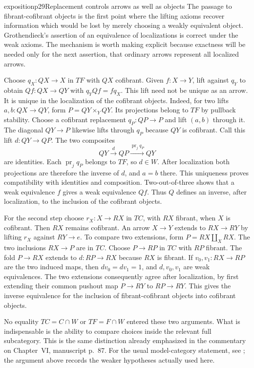 \begin{dcomment}{exposition}{p29}{Replacement controls arrows as well as objects}
The passage to fibrant-cofibrant objects is the first point where the lifting axioms recover information which would be lost by merely choosing a weakly equivalent object. Grothendieck's assertion of an equivalence of localizations is correct under the weak axioms. The mechanism is worth making explicit because exactness will be needed only for the next assertion, that ordinary arrows represent all localized arrows.

Choose $q_X:QX\to X$ in $TF$ with $QX$ cofibrant. Given $f:X\to Y$, lift against $q_Y$ to obtain $Qf:QX\to QY$ with $q_YQf=fq_X$. This lift need not be unique as an arrow. It is unique in the localization of the cofibrant objects. Indeed, for two lifts $a,b:QX\to QY$, form $P=QY\times_YQY$. Its projections belong to $TF$ by pullback stability. Choose a cofibrant replacement $q_P:QP\to P$ and lift $(a,b)$ through it. The diagonal $QY\to P$ likewise lifts through $q_P$ because $QY$ is cofibrant. Call this lift $d:QY\to QP$. The two composites
\[
 QY\xrightarrow{d}QP\xrightarrow{\operatorname{pr}_j q_P}QY
\]
are identities. Each $\operatorname{pr}_j q_P$ belongs to $TF$, so $d\in W$. After localization both projections are therefore the inverse of $d$, and $a=b$ there. This uniqueness proves compatibility with identities and composition. Two-out-of-three shows that a weak equivalence $f$ gives a weak equivalence $Qf$. Thus $Q$ defines an inverse, after localization, to the inclusion of the cofibrant objects.

For the second step choose $r_X:X\to RX$ in $TC$, with $RX$ fibrant, when $X$ is cofibrant. Then $RX$ remains cofibrant. An arrow $X\to Y$ extends to $RX\to RY$ by lifting $r_X$ against $RY\to e$. To compare two extensions, form $P=RX\amalg_XRX$. The two inclusions $RX\to P$ are in $TC$. Choose $P\to RP$ in $TC$ with $RP$ fibrant. The fold $P\to RX$ extends to $d:RP\to RX$ because $RX$ is fibrant. If $v_0,v_1:RX\to RP$ are the two induced maps, then $dv_0=dv_1=1$, and $d,v_0,v_1$ are weak equivalences. The two extensions consequently agree after localization, by first extending their common pushout map $P\to RY$ to $RP\to RY$. This gives the inverse equivalence for the inclusion of fibrant-cofibrant objects into cofibrant objects.

No equality $TC=C\cap W$ or $TF=F\cap W$ entered these two arguments. What is indispensable is the ability to compare choices inside the relevant full subcategory. This is the same distinction already emphasized in the commentary on Chapter~VI, manuscript p.~87. For the usual model-category statement, see \citet[Theorem~2.2.15 and Corollary~2.2.18]{Cisinski2019HigherCategories}; the argument above records the weaker hypotheses actually used here.
\end{dcomment}


